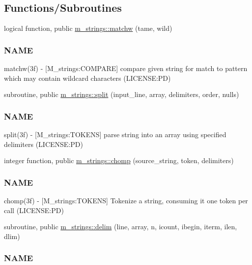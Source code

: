 \subsection*{Functions/\+Subroutines}
\begin{DoxyCompactItemize}
\item 
logical function, public \mbox{\hyperlink{namespacem__strings_a5f96f66162f0f04d58b4f5dced8e82c6}{m\+\_\+strings\+::matchw}} (tame, wild)
\begin{DoxyCompactList}\small\item\em \subsubsection*{N\+A\+ME}

matchw(3f) -\/ \mbox{[}M\+\_\+strings\+:C\+O\+M\+P\+A\+RE\mbox{]} compare given string for match to pattern which may contain wildcard characters (L\+I\+C\+E\+N\+SE\+:PD) \end{DoxyCompactList}\item 
subroutine, public \mbox{\hyperlink{namespacem__strings_a3f0119fab962146c7656cad592dd9acd}{m\+\_\+strings\+::split}} (input\+\_\+line, array, delimiters, order, nulls)
\begin{DoxyCompactList}\small\item\em \subsubsection*{N\+A\+ME}

split(3f) -\/ \mbox{[}M\+\_\+strings\+:T\+O\+K\+E\+NS\mbox{]} parse string into an array using specified delimiters (L\+I\+C\+E\+N\+SE\+:PD) \end{DoxyCompactList}\item 
integer function, public \mbox{\hyperlink{namespacem__strings_aa3fc15a665eeff512b7f5269029f558d}{m\+\_\+strings\+::chomp}} (source\+\_\+string, token, delimiters)
\begin{DoxyCompactList}\small\item\em \subsubsection*{N\+A\+ME}

chomp(3f) -\/ \mbox{[}M\+\_\+strings\+:T\+O\+K\+E\+NS\mbox{]} Tokenize a string, consuming it one token per call (L\+I\+C\+E\+N\+SE\+:PD) \end{DoxyCompactList}\item 
subroutine, public \mbox{\hyperlink{namespacem__strings_a9890da826d63d6f04367887007611cb5}{m\+\_\+strings\+::delim}} (line, array, n, icount, ibegin, iterm, ilen, dlim)
\begin{DoxyCompactList}\small\item\em \subsubsection*{N\+A\+ME}


\end{DoxyCompactList}
\end{DoxyCompactItemize}
